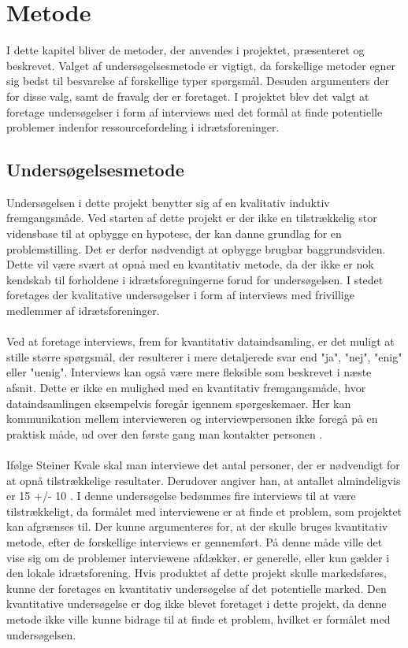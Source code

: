 \chapter{Metode}\label{ch:chlabel}
I dette kapitel bliver de metoder, der anvendes i projektet, præsenteret og beskrevet. Valget af undersøgelsesmetode er vigtigt, da forskellige metoder egner sig bedst til besvarelse af forskellige typer spørgsmål. Desuden argumenters der for disse valg, samt de fravalg der er foretaget. I projektet blev det valgt at foretage undersøgelser i form af interviews med det formål at finde potentielle problemer indenfor ressourcefordeling i idrætsforeninger.

\section{Undersøgelsesmetode}
Undersøgelsen i dette projekt benytter sig af en kvalitativ induktiv fremgangsmåde. 
Ved starten af dette projekt er der ikke en tilstrækkelig stor vidensbase til at opbygge en hypotese, der kan danne grundlag for en problemstilling. Det er derfor nødvendigt at opbygge brugbar baggrundsviden. Dette vil være svært at opnå med en kvantitativ metode, da der ikke er nok kendskab til forholdene i idrætsforegningerne forud for undersøgelsen. I stedet foretages der kvalitative undersøgelser i form af interviews med frivillige medlemmer af idrætsforeninger.
\\\\
Ved at foretage interviews, frem for kvantitativ dataindsamling, er det muligt at stille større spørgsmål, der resulterer i mere detaljerede svar end "ja", "nej", "enig" eller "uenig". Interviews kan også være mere fleksible som beskrevet i næste afsnit. Dette er ikke en mulighed med en kvantitativ fremgangsmåde, hvor dataindsamlingen eksempelvis foregår igennem spørgeskemaer. Her kan kommunikation mellem intervieweren og interviewpersonen ikke foregå på en praktisk måde, ud over den første gang man kontakter personen \citep{kvale2015}.
\\\\
Ifølge Steiner Kvale skal man interviewe det antal personer, der er nødvendigt for at opnå tilstrækkelige resultater. Derudover angiver han, at antallet almindeligvis er 15 +/- 10 \cite{kvale2015}. I denne undersøgelse bedømmes fire interviews til at være tilstrækkeligt, da formålet med interviewene er at finde et problem, som projektet kan afgrænses til. Der kunne argumenteres for, at der skulle bruges kvantitativ metode, efter de forskellige interviews er gennemført. På denne måde ville det vise sig om de problemer interviewene afdækker, er generelle, eller kun gælder i den lokale idrætsforening. Hvis produktet af dette projekt skulle markedsføres, kunne der foretages en kvantitativ undersøgelse af det potentielle marked. Den kvantitative undersøgelse er dog ikke blevet foretaget i dette projekt, da denne metode ikke ville kunne bidrage til at finde et problem, hvilket er formålet med undersøgelsen.
